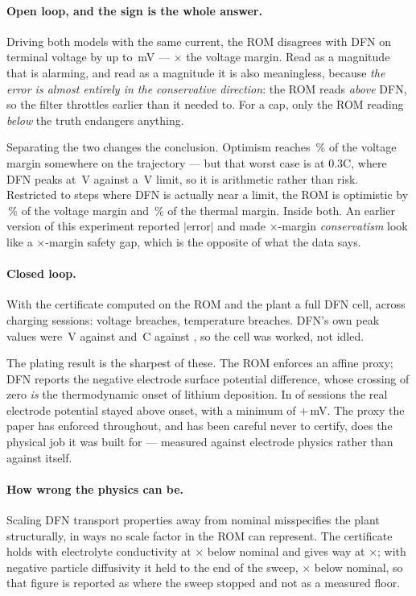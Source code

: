 \documentclass[11pt,letterpaper]{article}
\theoremstyle{definition}
\theoremstyle{remark}
\newcommand{\SI}[2]{#1\,#2}
\newcommand{\degreeCelsius}{\degC}
\newcommand{\degC}{\ifmmode{^\circ}\mathrm{C}\else\textdegree C\fi}
\begin{document}
\paragraph{Open loop, and the sign is the whole answer.} Driving both models with the same
current, the ROM disagrees with DFN on terminal voltage by up to \dOverV\,mV --- \dOverRatio$\times$
the voltage margin. Read as a magnitude that is alarming, and read as a magnitude it is also
meaningless, because \emph{the error is almost entirely in the conservative direction}: the ROM
reads \emph{above} DFN, so the filter throttles earlier than it needed to. For a cap, only the
ROM reading \emph{below} the truth endangers anything.

Separating the two changes the conclusion. Optimism reaches \dUnderV\,\% of the voltage margin
somewhere on the trajectory --- but that worst case is at 0.3C, where DFN peaks at
\dLowestPeakV\,V against a \dVmaxLim\,V limit, so it is arithmetic rather than risk. Restricted to
steps where DFN is actually near a limit, the ROM is optimistic by \dNearV\,\% of the voltage
margin and \dNearT\,\% of the thermal margin. Inside both. An earlier version of this experiment
reported $|\text{error}|$ and made \dOverRatio$\times$-margin \emph{conservatism} look like a
\dOverRatio$\times$-margin safety gap, which is the opposite of what the data says.

\paragraph{Closed loop.} With the certificate computed on the ROM and the plant a full DFN cell,
across \dSessions{} charging sessions: \dViolV{} voltage breaches, \dViolT{} temperature
breaches. DFN's own peak values were \dPeakV\,V against \dVmaxLim{} and \SI{\dPeakT}{\degreeCelsius} against
\dTmaxLim, so the cell was worked, not idled.

The plating result is the sharpest of these. The ROM enforces an affine proxy; DFN reports the
negative electrode surface potential difference, whose crossing of zero \emph{is} the
thermodynamic onset of lithium deposition. In \dPlateClean{} of \dSessions{} sessions the real
electrode potential stayed above onset, with a minimum of $+$\dMinPhi\,mV. The proxy the paper has
enforced throughout, and has been careful never to certify, does the physical job it was built
for --- measured against electrode physics rather than against itself.

\paragraph{How wrong the physics can be.} Scaling DFN transport properties away from nominal
misspecifies the plant structurally, in ways no scale factor in the ROM can represent. The
certificate holds with electrolyte conductivity at \dEcHeld$\times$ below nominal and gives way at
\dEcBreak$\times$; with negative particle diffusivity it held to the end of the sweep,
\dDiffSwept$\times$ below nominal, so that figure is reported as where the sweep stopped and not
as a measured floor.
\end{document}
